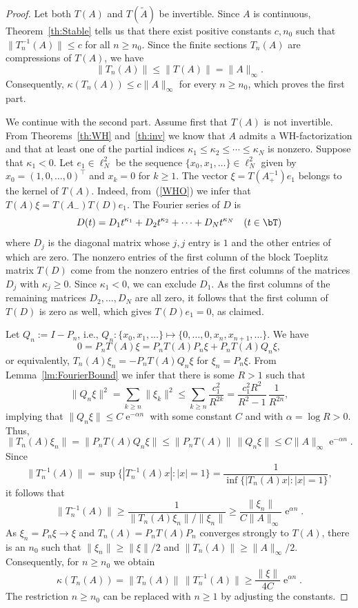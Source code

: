 \documentclass[addpoints,12pt,letter]{article}
\DeclareMathOperator{\e}{e}
\newcommand{\al}{\alpha}
\newcommand{\ka}{\kappa}
\newcommand{\nf}{\infty}
\newcommand{\ti}{\tilde}
\renewcommand{\ge}{\geqslant}
\renewcommand{\le}{\leqslant}
\numberwithin{equation}{section}
\theoremstyle{definition}
\begin{document}
\begin{proof}
Let both $T(A)$ and $T(\ti{A})$ be invertible.
Since $A$ is continuous, Theorem~\ref{th:Stable} tells us that there exist positive constants $c,n_{0}$ such that $\|T_{n}^{-1}(A)\|\le c$ for all $n\ge n_{0}$.
Since the finite sections $T_{n}(A)$ are compressions of $T(A)$, we have
\[
\|T_{n}(A)\|\le\|T(A)\|=\|A\|_{\nf}.
\]
Consequently, $\ka(T_{n}(A))\le c\|A\|_{\nf}$ for every $n\ge n_{0}$, which proves the first part.

We continue with the second part.
Assume first that $T(A)$ is not invertible.
From Theorems~\ref{th:WH} and~\ref{th:inv} we know that $A$ admits a WH-factorization and that at least one of the partial indices $\ka_{1}\le\ka_{2}\le\cdots\le\ka_{N}$ is nonzero.
Suppose that $\ka_{1}<0$.
Let $e_{1}\in\ell_{N}^{2}$ be the sequence $\{x_{0},x_{1},\ldots\}\in\ell_{N}^{2}$ given by $x_{0}=(1,0,\ldots,0)^\top$ and $x_{k}=0$ for $k\ge 1$.
The vector $\xi=T(A_{+}^{-1})e_{1}$ belongs to the kernel of $T(A)$.
Indeed, from~(\ref{WHO}) we infer that $T(A)\xi=T(A_{-})T(D)e_{1}$.
The Fourier series of $D$ is
\[
D(t)=D_{1} t^{\ka_{1}}+D_{2} t^{\ka_{2}}+\cdots+D_N t^{\ka_N} \quad (t\in\bT)
\]
where $D_{j}$ is the diagonal matrix whose $j,j$ entry is $1$ and the other entries of which are zero.
The nonzero entries of the first column of the block Toeplitz matrix $T(D)$ come from the nonzero entries of the first columns of the matrices $D_{j}$ with $\ka_{j}\ge 0$.
Since $\ka_{1}<0$, we can exclude $D_{1}$.
As the first columns of the remaining matrices $D_{2}, \ldots, D_N$
are all zero, it follows that the first column of $T(D)$ is zero as well, which gives $T(D)e_{1}=0$, as claimed.

Let $Q_{n}:=I-P_{n}$, i.e., $Q_{n}: \{x_{0},x_{1},\ldots\}\mapsto \{0, \ldots,0, x_{n}, x_{n+1}, \ldots\}$.
We have
\[
0=P_{n}T(A)\xi=P_{n}T(A)P_{n}\xi+P_{n}T(A)Q_{n}\xi,
\]
or equivalently, $T_{n}(A)\xi_{n}=-P_{n}T(A)Q_{n}\xi$ for $\xi_{n}=P_{n}\xi$.
From Lemma~\ref{lm:FourierBound} we infer that there is some $R>1$ such that
\[
\|Q_{n}\xi\|^{2}=\sum_{k\ge n}\|\xi_{k}\|^{2}\le\sum_{k\ge n}\frac{c_{1}^{2}}{R^{2k}}=\frac{c_{1}^{2}R^{2}}{R^{2}-1}\,\frac{1}{R^{2n}},
\]
implying that $\|Q_{n}\xi\|\le C\e^{-\al n}$ with some constant $C$ and with $\al=\log R>0$.
Thus,
\[
\|T_{n}(A)\xi_{n}\|=\|P_{n} T(A)Q_{n}\xi\|\le\|P_{n} T(A)\|\,\|Q_{n}\xi\|\le C\|A\|_{\nf} \e^{-\al n}.
\]
Since
\[
\|T_{n}^{-1}(A)\|=
\sup\{|T_{n}^{-1}(A)x|:|x|=1\}=
\frac{1}{\inf\{|T_{n}(A)x|:|x|=1\}},
\]
it follows that
\[
\|T_{n}^{-1}(A)\|\ge\frac{1}{\|T_{n}(A)\xi_{n}\|/\|\xi_{n}\|}\ge\frac{\|\xi_{n}\|}{C\|A\|_{\nf}}\e^{\al n}.
\]
As $\xi_{n}=P_{n} \xi\to\xi$ and $T_{n}(A)=P_{n}T(A)P_{n}$ converges strongly to $T(A)$, there is an $n_{0}$ such that $\|\xi_{n}\|\ge\|\xi\|/2$ and $\|T_{n}(A)\|\ge\|A\|_{\nf}/2$.
Consequently, for $n\ge n_{0}$ we obtain
\[
\ka(T_{n}(A))=\|T_{n}(A)\|\,\|T_{n}^{-1}(A)\|\ge\frac{\|\xi\|}{4C}\e^{\al n}.
\]
The restriction $n\ge n_{0}$ can be replaced with $n\ge 1$ by adjusting the constants.


\end{proof}
\end{document}
